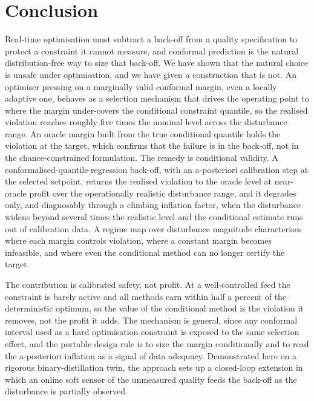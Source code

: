 \section{Conclusion}
\label{sec:conclusion}

Real-time optimisation must subtract a back-off from a quality specification to protect a
constraint it cannot measure, and conformal prediction is the natural distribution-free way to
size that back-off. We have shown that the natural choice is unsafe under optimisation, and we
have given a construction that is not. An optimiser pressing on a
marginally valid conformal margin, even a locally adaptive one, behaves as a selection mechanism
that drives the operating point to where the margin under-covers the conditional constraint
quantile, so the realised violation reaches roughly five times the nominal level across the
disturbance range. An oracle margin built from the true conditional quantile holds the violation
at the target, which confirms that the failure is in the back-off, not in the chance-constrained
formulation. The remedy is conditional validity. A conformalised-quantile-regression back-off,
with an a-posteriori calibration step at the selected setpoint, returns the realised violation to
the oracle level at near-oracle profit over the operationally realistic disturbance range, and it
degrades only, and diagnosably through a climbing inflation factor, when the disturbance widens
beyond several times the realistic level and the conditional estimate runs out of calibration
data. A regime map over disturbance magnitude characterises where each margin controls violation,
where a constant margin becomes infeasible, and where even the conditional method can no longer
certify the target.

The contribution is calibrated safety, not profit. At a well-controlled feed the constraint is
barely active and all methods earn within half a percent of the deterministic optimum, so the
value of the conditional method is the violation it removes, not the profit it adds. The mechanism
is general, since any conformal interval used as a hard optimisation constraint is exposed to the
same selection effect, and the portable design rule is to size the margin conditionally and to
read the a-posteriori inflation as a signal of data adequacy. Demonstrated here on a rigorous
binary-distillation twin, the approach sets up a closed-loop extension in which an online soft
sensor of the unmeasured quality feeds the back-off as the disturbance is partially observed.
